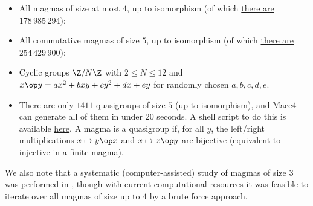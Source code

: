 \begin{itemize}
  \item All magmas of size at most $4$, up to isomorphism (of which \href{https://oeis.org/A001329}{there are $178\,985\,294$});
  \item All commutative magmas of size $5$, up to isomorphism (of which \href{https://oeis.org/A001425}{there are $254\,429\,900$});
  \item Cyclic groups $\Z/N\Z$ with $2 \leq N \leq 12$ and $x \op y = ax^2+bxy+cy^2+dx+ey$ for randomly chosen $a,b,c,d,e$.
  \item There are only \href{https://oeis.org/A057991}{$1411$ quasigroups of size $5$} (up to isomorphism), and Mace4 can generate all of them in under 20 seconds. A shell script to do this is available \href{https://github.com/zaklogician/equational_theories/tree/cancellative_magmas/scripts/cancellative_magmas}{here}. A magma is a quasigroup if, for all $y$, the left/right multiplications $x\mapsto y\op x$ and $x\mapsto x\op y$ are bijective (equivalent to injective in a finite magma).
\end{itemize}

We also note that a systematic (computer-assisted) study of magmas of size $3$ was performed in \cite{berman-burris}, though with current computational resources it was feasible to iterate over all magmas of size up to $4$ by a brute force approach.

